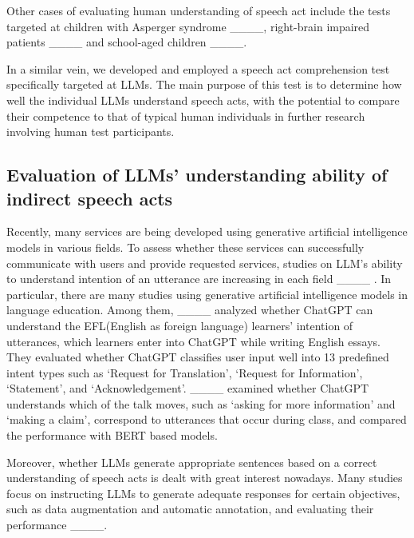Other cases of evaluating human understanding of speech act include the tests targeted at children with Asperger syndrome ____, right-brain impaired patients ____ and school-aged children ____.

In a similar vein, we developed and employed a speech act comprehension test specifically targeted at LLMs. The main purpose of this test is to determine how well the individual LLMs understand speech acts, with the potential to compare their competence to that of typical human individuals in further research involving human test participants.

\subsection*{Evaluation of LLMs’ understanding ability of indirect speech acts}

Recently, many services are being developed using generative artificial intelligence models in various fields. To assess whether these services can successfully communicate with users and provide requested services, studies on LLM’s ability to understand intention of an utterance are increasing in each field ____ . In particular, there are many studies using generative artificial intelligence models in language education. Among them, ____ analyzed whether ChatGPT can understand the EFL(English as foreign language) learners’ intention of utterances, which learners enter into ChatGPT while writing English essays. They evaluated whether ChatGPT classifies user input well into 13 predefined intent types such as ‘Request for Translation’, ‘Request for Information’, ‘Statement’, and ‘Acknowledgement’. ____ examined whether ChatGPT understands which of the talk moves, such as ‘asking for more information’ and ‘making a claim’, correspond to utterances that occur during class, and compared the performance with BERT based models.


Moreover, whether LLMs generate appropriate sentences based on a correct understanding of speech acts is dealt with great interest nowadays. Many studies focus on instructing LLMs to generate adequate responses for certain objectives, such as data augmentation and automatic annotation, and evaluating their performance ____.

